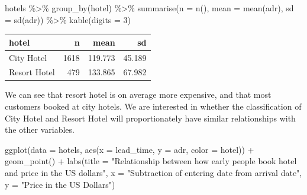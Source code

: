 \documentclass[
]{article}
\newenvironment{Shaded}{\begin{snugshade}}{\end{snugshade}}
\newcommand{\AttributeTok}[1]{\textcolor[rgb]{0.77,0.63,0.00}{#1}}
\newcommand{\DecValTok}[1]{\textcolor[rgb]{0.00,0.00,0.81}{#1}}
\newcommand{\FunctionTok}[1]{\textcolor[rgb]{0.00,0.00,0.00}{#1}}
\newcommand{\NormalTok}[1]{#1}
\newcommand{\SpecialCharTok}[1]{\textcolor[rgb]{0.00,0.00,0.00}{#1}}
\newcommand{\StringTok}[1]{\textcolor[rgb]{0.31,0.60,0.02}{#1}}
\begin{document}
\begin{Shaded}
\begin{Highlighting}[]
\NormalTok{hotels }\SpecialCharTok{\%\textgreater{}\%}
  \FunctionTok{group\_by}\NormalTok{(hotel) }\SpecialCharTok{\%\textgreater{}\%}
  \FunctionTok{summarise}\NormalTok{(}\AttributeTok{n =} \FunctionTok{n}\NormalTok{(), }\AttributeTok{mean =} \FunctionTok{mean}\NormalTok{(adr), }\AttributeTok{sd =} \FunctionTok{sd}\NormalTok{(adr)) }\SpecialCharTok{\%\textgreater{}\%}
  \FunctionTok{kable}\NormalTok{(}\AttributeTok{digits =} \DecValTok{3}\NormalTok{)}
\end{Highlighting}
\end{Shaded}

\begin{longtable}[]{@{}lrrr@{}}
\toprule
hotel & n & mean & sd \\
\midrule
\endhead
City Hotel & 1618 & 119.773 & 45.189 \\
Resort Hotel & 479 & 133.865 & 67.982 \\
\bottomrule
\end{longtable}

We can see that resort hotel is on average more expensive, and that most
customers booked at city hotels. We are interested in whether the
classification of City Hotel and Resort Hotel will proportionately have
similar relationships with the other variables.

\begin{Shaded}
\begin{Highlighting}[]
\FunctionTok{ggplot}\NormalTok{(}\AttributeTok{data =}\NormalTok{ hotels, }\FunctionTok{aes}\NormalTok{(}\AttributeTok{x =}\NormalTok{ lead\_time, }\AttributeTok{y =}\NormalTok{ adr, }\AttributeTok{color =}\NormalTok{ hotel)) }\SpecialCharTok{+}
\FunctionTok{geom\_point}\NormalTok{() }\SpecialCharTok{+}
\FunctionTok{labs}\NormalTok{(}\AttributeTok{title =} \StringTok{"Relationship between how early people book hotel and price in the US dollars"}\NormalTok{,}
  \AttributeTok{x =} \StringTok{"Subtraction of entering date from arrival date"}\NormalTok{,}
  \AttributeTok{y =} \StringTok{"Price in the US Dollars"}\NormalTok{) }
\end{Highlighting}
\end{Shaded}
\end{document}
